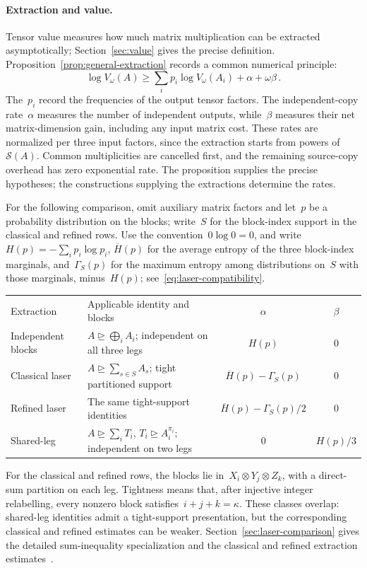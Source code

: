 \documentclass[11pt,letterpaper]{article}
\theoremstyle{definition}
\numberwithin{equation}{section}
\newcommand{\degen}{\unrhd}
\begin{document}
\paragraph{Extraction and value.}
Tensor value measures how much matrix multiplication can be extracted asymptotically; Section~\ref{sec:value} gives the precise definition. Proposition~\ref{prop:general-extraction} records a common numerical principle:
\begin{equation*}
 \log V_\omega(A)\geq
 \sum_i p_i\log V_\omega(A_i)+\alpha+\omega\beta\,.
\end{equation*}
The~$p_i$ record the frequencies of the output tensor factors. The independent-copy rate~$\alpha$ measures the number of independent outputs, while~$\beta$ measures their net matrix-dimension gain, including any input matrix cost. These rates are normalized per three input factors, since the extraction starts from powers of~$\mathcal S(A)$. Common multiplicities are cancelled first, and the remaining source-copy overhead has zero exponential rate. The proposition supplies the precise hypotheses; the constructions supplying the extractions determine the rates.

For the following comparison, omit auxiliary matrix factors and let~$p$ be a probability distribution on the blocks; write~$S$ for the block-index support in the classical and refined rows. Use the convention~$0\log0=0$, and write~$H(p)=-\sum_i p_i\log p_i$, $\overline H(p)$ for the average entropy of the three block-index marginals, and~$\Gamma_S(p)$ for the maximum entropy among distributions on~$S$ with those marginals, minus~$H(p)$; see~\eqref{eq:laser-compatibility}.
\begin{center}
\begingroup
\small
\renewcommand{\arraystretch}{1.2}
\begin{tabular}{@{}>{\raggedright\arraybackslash}p{.18\linewidth}>{\raggedright\arraybackslash}p{.39\linewidth}cc@{}}
Extraction & Applicable identity and blocks & $\alpha$ & $\beta$\\[3pt]
Independent blocks & $A\degen\bigoplus_i A_i$; independent on all three legs & $H(p)$ & $0$\\
Classical laser & $A\degen\sum_{s\in S}A_s$; tight partitioned support & $\overline H(p)-\Gamma_S(p)$ & $0$\\
Refined laser & The same tight-support identities & $\overline H(p)-\Gamma_S(p)/2$ & $0$\\
Shared-leg & $A\degen\sum_iT_i$, $T_i\degen A_i^{\pi_i}$; independent on two legs & $0$ & $H(p)/3$
\end{tabular}
\endgroup
\end{center}
For the classical and refined rows, the blocks lie in~$X_i\otimes Y_j\otimes Z_k$, with a direct-sum partition on each leg. Tightness means that, after injective integer relabelling, every nonzero block satisfies~$i+j+k=\kappa$. These classes overlap: shared-leg identities admit a tight-support presentation, but the corresponding classical and refined estimates can be weaker. Section~\ref{sec:laser-comparison} gives the detailed sum-inequality specialization and the classical and refined extraction estimates~\cite{Sch81,LG14,AW21}.
\end{document}
